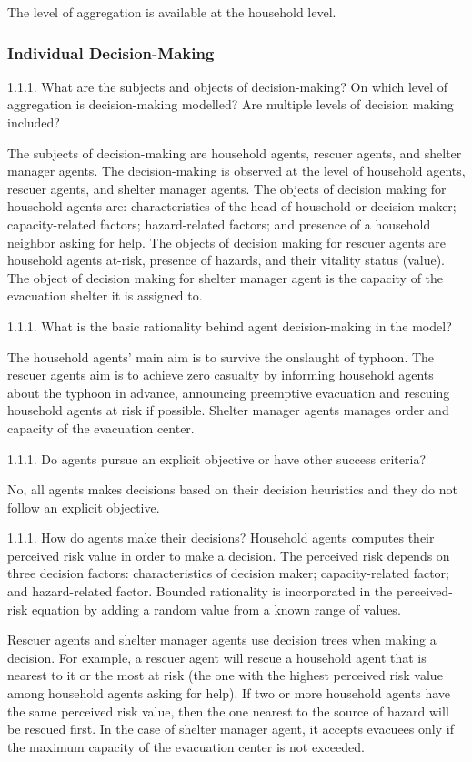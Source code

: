 \documentclass[runningheads]{llncs}
\begin{document}
The level of aggregation is available at the household level.

\subsubsection{Individual Decision-Making}
1.1.1.	What are the subjects and objects of decision-making? On which level of aggregation is decision-making modelled? Are multiple levels of decision making included?

The subjects of decision-making are household agents, rescuer agents, and shelter manager agents. The decision-making is observed at the level of household agents, rescuer agents, and shelter manager agents. The objects of decision making for household agents are: characteristics  of the head of household or decision maker; capacity-related factors; hazard-related factors; and presence of a household neighbor asking for help. The objects of decision making for rescuer agents are household agents at-risk, presence of hazards, and their vitality status (value). The object of decision making for shelter manager agent is the capacity of the evacuation shelter it is assigned to.  

1.1.1.	What is the basic rationality behind agent decision-making in the model?

The household agents’ main aim is to survive the onslaught of typhoon. The rescuer agents aim is to achieve zero casualty by informing household agents about the typhoon in advance, announcing preemptive evacuation and rescuing household agents at risk if possible. Shelter manager agents manages order and capacity of the evacuation center.

1.1.1.	Do agents pursue an explicit objective or have other success criteria?

No, all agents makes decisions based on their decision heuristics and they do not follow an explicit objective.

1.1.1.	How do agents make their decisions?
Household agents computes their perceived risk value in order to make a decision. The perceived risk depends on three decision factors: characteristics of decision maker; capacity-related factor; and hazard-related factor. Bounded rationality is incorporated in the perceived-risk equation by adding a random value from a known range of values.

Rescuer agents and shelter manager agents use decision trees when making a decision. For example, a rescuer agent will rescue a household agent that is nearest to it or the most at risk (the one with the highest perceived risk value among household agents asking for help). If two or more household agents have the same perceived risk value, then the one nearest to the source of hazard will be rescued first. In the case of shelter manager agent, it accepts evacuees only if the maximum capacity of the evacuation center is not exceeded. 
\end{document}
